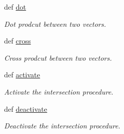 \begin{DoxyCompactItemize}
def \hyperlink{classlib_1_1Intersection_1_1Intersection_ad49cb21fbe7a7c94ca8212a0e3421b8a}{dot}
\begin{DoxyCompactList}\small\item\em \-Dot prodcut between two vectors. \end{DoxyCompactList}\item 
def \hyperlink{classlib_1_1Intersection_1_1Intersection_a45032076f1fe019a9d206e9213fe2d54}{cross}
\begin{DoxyCompactList}\small\item\em \-Cross prodcut between two vectors. \end{DoxyCompactList}\item 
def \hyperlink{classlib_1_1Intersection_1_1Intersection_a136e4cfa2ada69034767fb5523c304b3}{activate}
\begin{DoxyCompactList}\small\item\em \-Activate the intersection procedure. \end{DoxyCompactList}\item 
def \hyperlink{classlib_1_1Intersection_1_1Intersection_a467d2946429de30b1428f2f32fb868ac}{deactivate}
\begin{DoxyCompactList}\small\item\em \-Deactivate the intersection procedure. \end{DoxyCompactList}\end{DoxyCompactItemize}
